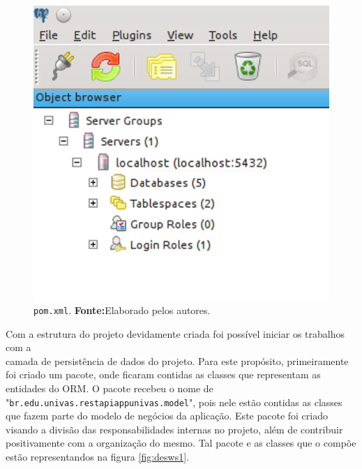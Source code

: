 \begin{figure}[h!]
	\centerline{\includegraphics[scale=0.8]{./imagens/2_q_metodologico/4_procedimentos_resultados/43_webservice/432_desenvolvimento/desws.png}}
	\caption[\texttt{pom.xml}]{\texttt{pom.xml}.
		\textbf{Fonte:}Elaborado pelos autores.}
	\label{fig:desws}
\end{figure}

	

	\par Com a estrutura do projeto devidamente criada foi possível iniciar os
trabalhos com a \\ camada de persistência de dados do projeto. Para este
propósito, primeiramente foi criado um pacote, onde ficaram contidas as classes
que representam as entidades do ORM. O pacote recebeu o nome de
"\texttt{br.edu.univas.restapiappunivas.model}", pois nele estão contidas as
classes que fazem parte do modelo de negócios da aplicação. Este pacote foi
criado visando a divisão das responsabilidades internas no projeto, além de
contribuir positivamente com a organização do mesmo. Tal pacote e as classes
que o compõe estão representandos na figura \ref{fig:desws1}.

